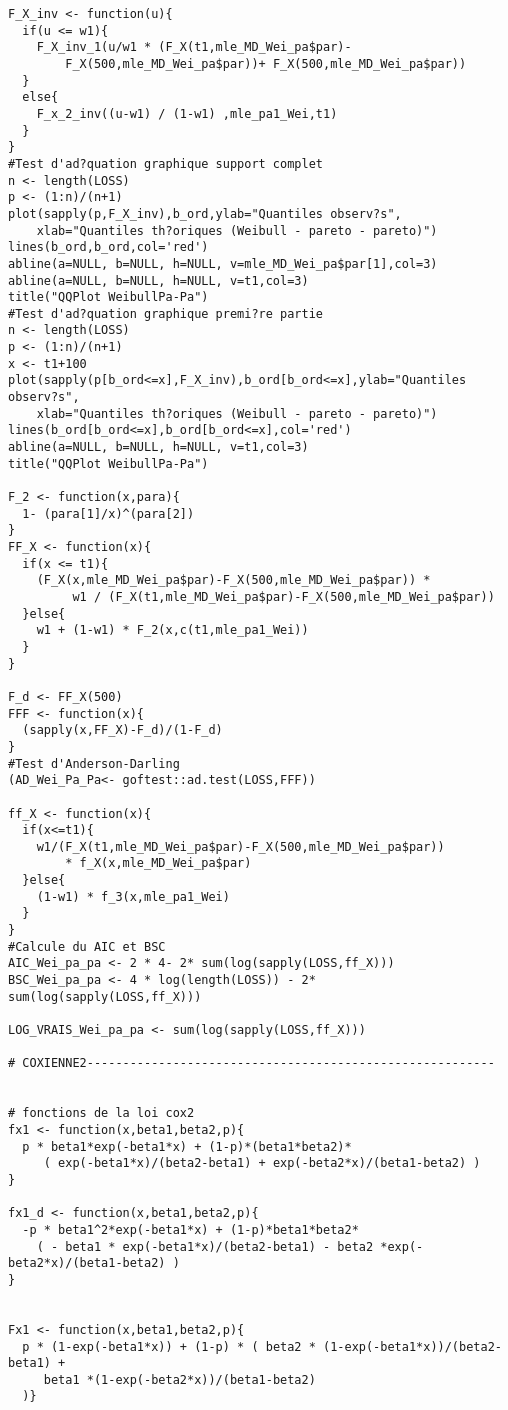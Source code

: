 \begin{verbatim}
F_X_inv <- function(u){
  if(u <= w1){
    F_X_inv_1(u/w1 * (F_X(t1,mle_MD_Wei_pa$par)-
    	F_X(500,mle_MD_Wei_pa$par))+ F_X(500,mle_MD_Wei_pa$par))
  }
  else{
    F_x_2_inv((u-w1) / (1-w1) ,mle_pa1_Wei,t1)
  }  
}
#Test d'ad?quation graphique support complet
n <- length(LOSS)
p <- (1:n)/(n+1)
plot(sapply(p,F_X_inv),b_ord,ylab="Quantiles observ?s",
	xlab="Quantiles th?oriques (Weibull - pareto - pareto)")
lines(b_ord,b_ord,col='red')
abline(a=NULL, b=NULL, h=NULL, v=mle_MD_Wei_pa$par[1],col=3)
abline(a=NULL, b=NULL, h=NULL, v=t1,col=3)
title("QQPlot WeibullPa-Pa")
#Test d'ad?quation graphique premi?re partie
n <- length(LOSS)
p <- (1:n)/(n+1)
x <- t1+100
plot(sapply(p[b_ord<=x],F_X_inv),b_ord[b_ord<=x],ylab="Quantiles observ?s",
	xlab="Quantiles th?oriques (Weibull - pareto - pareto)")
lines(b_ord[b_ord<=x],b_ord[b_ord<=x],col='red')
abline(a=NULL, b=NULL, h=NULL, v=t1,col=3)
title("QQPlot WeibullPa-Pa")

F_2 <- function(x,para){
  1- (para[1]/x)^(para[2])
}
FF_X <- function(x){
  if(x <= t1){
    (F_X(x,mle_MD_Wei_pa$par)-F_X(500,mle_MD_Wei_pa$par)) *
    	 w1 / (F_X(t1,mle_MD_Wei_pa$par)-F_X(500,mle_MD_Wei_pa$par)) 
  }else{
    w1 + (1-w1) * F_2(x,c(t1,mle_pa1_Wei))
  }
}

F_d <- FF_X(500)
FFF <- function(x){
  (sapply(x,FF_X)-F_d)/(1-F_d)
}
#Test d'Anderson-Darling
(AD_Wei_Pa_Pa<- goftest::ad.test(LOSS,FFF))

ff_X <- function(x){
  if(x<=t1){
    w1/(F_X(t1,mle_MD_Wei_pa$par)-F_X(500,mle_MD_Wei_pa$par)) 
    	* f_X(x,mle_MD_Wei_pa$par)
  }else{
    (1-w1) * f_3(x,mle_pa1_Wei)
  } 
}
#Calcule du AIC et BSC
AIC_Wei_pa_pa <- 2 * 4- 2* sum(log(sapply(LOSS,ff_X)))
BSC_Wei_pa_pa <- 4 * log(length(LOSS)) - 2* sum(log(sapply(LOSS,ff_X)))

LOG_VRAIS_Wei_pa_pa <- sum(log(sapply(LOSS,ff_X)))

# COXIENNE2---------------------------------------------------------


# fonctions de la loi cox2
fx1 <- function(x,beta1,beta2,p){
  p * beta1*exp(-beta1*x) + (1-p)*(beta1*beta2)*
  	 ( exp(-beta1*x)/(beta2-beta1) + exp(-beta2*x)/(beta1-beta2) )
}

fx1_d <- function(x,beta1,beta2,p){
  -p * beta1^2*exp(-beta1*x) + (1-p)*beta1*beta2* 
  	( - beta1 * exp(-beta1*x)/(beta2-beta1) - beta2 *exp(-beta2*x)/(beta1-beta2) )
}


Fx1 <- function(x,beta1,beta2,p){
  p * (1-exp(-beta1*x)) + (1-p) * ( beta2 * (1-exp(-beta1*x))/(beta2-beta1) +
  	 beta1 *(1-exp(-beta2*x))/(beta1-beta2)
  )}


\end{verbatim}
